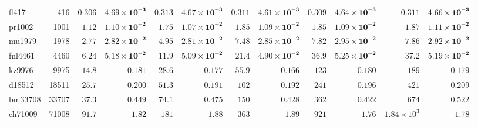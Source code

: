 \begin{table}[t]
{\begin{tabular}{@{}lr*{5}{rr}@{}}
\midrule
fl417 & 416 & $0.306$ & $\mathbf{4.69 \times 10^{-3}}$ & $0.313$ & $\mathbf{4.67 \times 10^{-3}}$ & $0.311$ & $\mathbf{4.61 \times 10^{-3}}$ & $0.309$ & $\mathbf{4.64 \times 10^{-3}}$ & $0.311$ & $\mathbf{4.66 \times 10^{-3}}$ \\
pr1002 & 1001 & $1.12$ & $\mathbf{1.10 \times 10^{-2}}$ & $1.75$ & $\mathbf{1.07 \times 10^{-2}}$ & $1.85$ & $\mathbf{1.09 \times 10^{-2}}$ & $1.85$ & $\mathbf{1.09 \times 10^{-2}}$ & $1.87$ & $\mathbf{1.11 \times 10^{-2}}$ \\
mu1979 & 1978 & $2.77$ & $\mathbf{2.82 \times 10^{-2}}$ & $4.95$ & $\mathbf{2.81 \times 10^{-2}}$ & $7.48$ & $\mathbf{2.85 \times 10^{-2}}$ & $7.82$ & $\mathbf{2.95 \times 10^{-2}}$ & $7.86$ & $\mathbf{2.92 \times 10^{-2}}$ \\
fnl4461 & 4460 & $6.24$ & $\mathbf{5.18 \times 10^{-2}}$ & $11.9$ & $\mathbf{5.09 \times 10^{-2}}$ & $21.4$ & $\mathbf{4.90 \times 10^{-2}}$ & $36.9$ & $\mathbf{5.25 \times 10^{-2}}$ & $37.2$ & $\mathbf{5.19 \times 10^{-2}}$ \\
kz9976 & 9975 & $14.8$ & $\mathbf{0.181}$ & $28.6$ & $\mathbf{0.177}$ & $55.9$ & $\mathbf{0.166}$ & $123$ & $\mathbf{0.180}$ & $189$ & $\mathbf{0.179}$ \\
d18512 & 18511 & $25.7$ & $\mathbf{0.200}$ & $51.3$ & $\mathbf{0.191}$ & $102$ & $\mathbf{0.192}$ & $241$ & $\mathbf{0.196}$ & $421$ & $\mathbf{0.209}$ \\
bm33708 & 33707 & $37.3$ & $\mathbf{0.449}$ & $74.1$ & $\mathbf{0.475}$ & $150$ & $\mathbf{0.428}$ & $362$ & $\mathbf{0.422}$ & $674$ & $\mathbf{0.522}$ \\
ch71009 & 71008 & $91.7$ & $\mathbf{1.82}$ & $181$ & $\mathbf{1.88}$ & $363$ & $\mathbf{1.89}$ & $921$ & $\mathbf{1.76}$ & $1.84 \times 10^{3}$ & $\mathbf{1.78}$ \\
\bottomrule
\end{tabular}%
}
\end{table}

\hardtimingtablebreak


